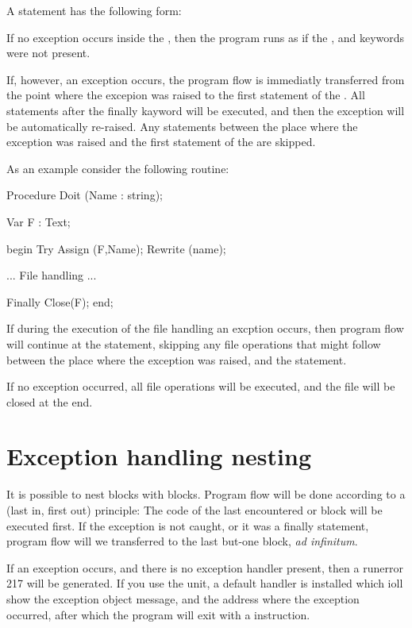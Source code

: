 \documentclass{report}
\begin{document}
A  statement has the following form:



If no exception occurs inside the , then the program
runs as if the ,  and  keywords were not
present.

If, however, an exception occurs, the program flow is immediatly
transferred from the point where the excepion was raised to the first 
statement  of the . 
All statements after the finally kayword will be executed, and then
the exception will be automatically re-raised. Any statements between the
place where the exception was raised and the first statement of the
 are skipped.

As an example consider the following routine:

\begin{listing}
Procedure Doit (Name : string);

Var F : Text;

begin
  Try
    Assign (F,Name);
    Rewrite (name);

    ... File handling ...

  Finally
    Close(F);
  end;  
\end{listing}
If during the execution of the file handling an excption occurs, then
program flow will continue at the  statement, skipping any
file operations that might follow between the place where the exception
was raised, and the  statement.

If no exception occurred, all file operations will be executed, and the file
will be closed at the end.

\section{Exception handling nesting}

It is possible to nest  blocks with 
blocks. Program flow will be done according to a  (last in, first
out) principle: The code of the last encountered  or
  block will be executed first. If the exception is not
caught, or it was a finally statement, program flow will we transferred to
the last but-one block, {\em ad infinitum}.

If an exception occurs, and there is no exception handler present, then a
runerror 217 will be generated. If you use the  unit, a default
handler is installed which ioll show the exception object message, and the
address where the exception occurred, after which the program will exit with
a  instruction.
\end{document}
